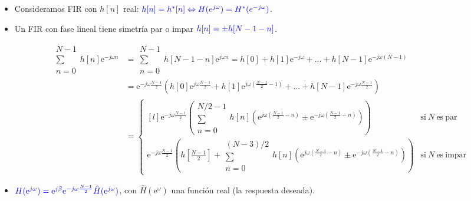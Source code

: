 \documentclass[handout]{beamer}
\numberwithin{section}{part}
\begin{document}
\begin{frame}
  \begin{itemize}
    \footnotesize
    \item Consideramos FIR con $h[n]$ real: $\color{blue}h[n] = h^*[n]\Leftrightarrow H(e^{j\omega})=H^*(e^{-j\omega})$.
    \item Un FIR con fase lineal tiene simetría par o impar $\color{blue}h[n]=\pm h[N-1-n]$.
    \hspace*{-1.25cm}\begin{minipage}{0.8\textwidth}
      \scriptsize
      \[\begin{aligned}
      \substack{N-1\\\sum\\n=0}h[n]\mathrm{e}^{-j\omega n}&=
      \substack{N-1\\\sum\\n=0}h[N-1-n]\mathrm{e}^{j\omega n}
      =h[0] + h[1]\mathrm{e}^{-j\omega} + ... + h[N-1] \mathrm{e}^{-j\omega (N-1)}\\
      &=\mathrm{e}^{-j\omega\frac{N-1}{2}}(h[0]\mathrm{e}^{j\omega\frac{N-1}{2}} + h[1]\mathrm{e}^{j\omega(\frac{N-1}{2} - 1)} + ... + h[N-1] \mathrm{e}^{-j\omega\frac{N-1}{2}})\\
      &=\left\{\begin{matrix*}[l]
        \mathrm{e}^{-j\omega\frac{N-1}{2}}\left(\substack{N/2-1\\\sum\\n=0}h[n](\mathrm{e}^{j\omega (\frac{N-1}{2} - n)}\pm\mathrm{e}^{-j \omega (\frac{N-1}{2} - n)})\right) & \mathrm{si}~N~\mathrm{es~par}\\[2ex]
        \mathrm{e}^{-j\omega\frac{N-1}{2}}\left(h[\frac{N-1}{2}] + \substack{(N-3)/2\\\sum\\n=0}h[n](\mathrm{e}^{j\omega (\frac{N-1}{2} - n)}\pm\mathrm{e}^{-j \omega (\frac{N-1}{2} - n)})\right) & \mathrm{si}~N~\mathrm{es~impar}
      \end{matrix*}\right.
      \end{aligned}
      \]
    \end{minipage}
    \item $\color{blue}H(\mathrm{e}^{j\omega})=\mathrm{e}^{j\beta}\mathrm{e}^{-j\omega\frac{N-1}{2}}\hat H(\mathrm{e}^{j\omega})$, con $\hat H(\mathrm{e}^{\omega})$ una función real (\alert{la respuesta deseada}).
  \end{itemize}
\end{frame}
\end{document}
